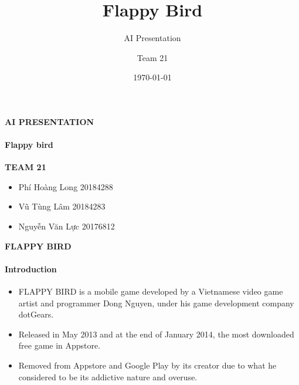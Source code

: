 \documentclass[10pt]{beamer}
\title{Flappy Bird}
\subtitle{AI Presentation}
\author{Team 21}
\institute{HUST}
\date{\today}
\begin{document}
{
%
\begin{frame}{\textbf{AI PRESENTATION}}
    \framesubtitle{Flappy bird}
    \textbf{TEAM 21}
\begin{itemize}
\item Phí Hoàng Long      20184288
\item Vũ Tùng Lâm         20184283
\item Nguyễn Văn Lực      20176812
\end{itemize}
\vspace{4cm}
\end{frame}
}
{
%
\begin{frame}{\textbf{FLAPPY BIRD}}
    \framesubtitle{\textbf{Introduction}}
\begin{itemize}
\item FLAPPY BIRD is a mobile game developed by a Vietnamese video game artist and programmer 
    Dong Nguyen, under his game development company dotGears.
    \pause
\item Released in May 2013 and at the end of January 2014, the most downloaded free game in Appstore.
\pause
\item Removed from Appstore and Google Play by its creator due to what he considered to be its addictive nature and overuse.
\end{itemize}
\vspace{4cm}
\end{frame}
}
\end{document}
